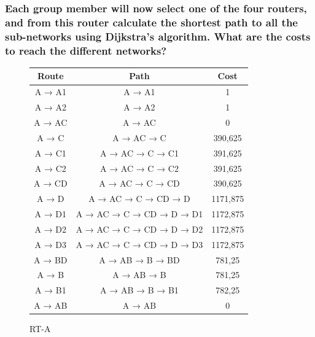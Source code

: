 \documentclass[a4paper, titlepage,12pt]{article}
\begin{document}
		\subsubsection{Each group member will now select one of the four routers, and from this router calculate the shortest path to all the sub-networks using Dijkstra's algorithm. What are the costs to reach the different networks?}


		\begin{figure}[H]
			\begin{center}
			\begin{tabular}{|c|c|c|}
				\hline
Route & Path & Cost \\ 
				\hline
A → A1 & A → A1 & 1 \\ 
				\hline
A → A2 & A → A2 & 1 \\ 
				\hline
A → AC & A → AC & 0 \\ 
				\hline
A → C & A → AC → C & 390,625 \\ 
				\hline
A → C1 & A → AC → C → C1 & 391,625 \\ 
				\hline
A → C2 & A → AC → C → C2 & 391,625 \\ 
				\hline
A → CD & A → AC → C → CD & 390,625 \\ 
				\hline
A → D & A → AC → C → CD → D & 1171,875 \\ 
				\hline
A → D1 & A → AC → C → CD → D → D1 & 1172,875 \\ 
				\hline
A → D2 & A → AC → C → CD → D → D2 & 1172,875 \\ 
				\hline
A → D3 & A → AC → C → CD → D → D3 & 1172,875 \\ 
				\hline
A → BD & A → AB → B → BD & 781,25 \\ 
				\hline
A → B & A → AB → B & 781,25 \\ 
				\hline
A → B1 & A → AB → B → B1 & 782,25 \\ 
				\hline
A → AB & A → AB & 0 \\ 
				\hline
				\end{tabular}
				\caption{RT-A}
			\end{center}
		\end{figure}
\end{document}
